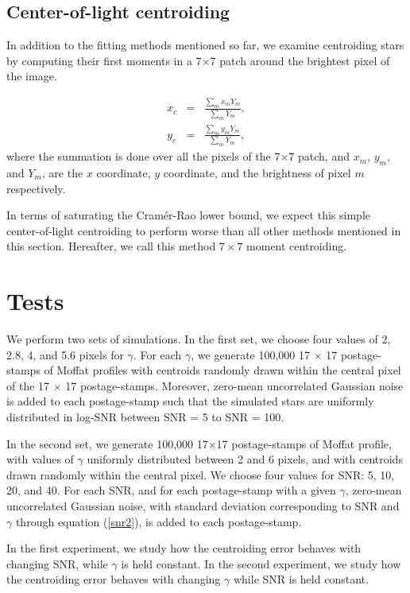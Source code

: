 \documentclass[onecolumn]{aastex61}
\newcommand{\todo}[1]{{\textcolor{dred}{ #1}}}
\begin{document}
\todo{\subsection{Center-of-light centroiding}}
In addition to the fitting methods 
mentioned so far, we examine centroiding 
stars by computing their first moments
in a 7$\times$7 patch around the brightest pixel of the image.

\begin{eqnarray}
x_{c} &=& \frac{\sum_{m}x_{m}Y_{m}}{\sum_{m}Y_{m}}, \\
y_{c} &=& \frac{\sum_{m}y_{m}Y_{m}}{\sum_{m}Y_{m}},
\end{eqnarray}
where the summation is done over all the pixels of the 7$\times$7 patch, and $x_{m}$, 
$y_{m}$, and $Y_{m}$, are the $x$ coordinate, $y$ coordinate, and the brightness
of pixel $m$ respectively.

In terms of saturating the Cram\'{e}r-Rao lower bound, we expect this simple 
center-of-light centroiding to perform worse than all other methods mentioned in 
this section. Hereafter, we call this method $7\times7$ moment centroiding.

\section{Tests}\label{sec:data}

We perform two sets of simulations. In the first set, we choose four values of
2, 2.8, 4, and 5.6 pixels for $\gamma$. For each $\gamma$, we generate 100,000 
17 $\times$ 17 postage-stamps of Moffat profiles with centroids randomly drawn
within the central pixel of the 17 $\times$ 17 postage-stamps. Moreover, zero-mean 
uncorrelated Gaussian noise is added to each postage-stamp such that the simulated 
stars are uniformly distributed in log-SNR between SNR = 5 to SNR = 100.

In the second set, we generate 100,000 17$\times$17 postage-stamps
of Moffat profile, with values of $\gamma$ uniformly distributed 
between 2 and 6 pixels, and with centroids drawn randomly within 
the central pixel. We choose four values for SNR: 5, 10, 20, and 40. 
For each SNR, and for each postage-stamp with a given $\gamma$, 
zero-mean uncorrelated Gaussian noise, with standard deviation corresponding 
to SNR and $\gamma$ through equation (\ref{snr2}), is added to each postage-stamp.

In the first experiment, we study how the centroiding error behaves with changing
SNR, while $\gamma$ is held constant. In the second experiment, we study 
how the centroiding error behaves with changing $\gamma$ while SNR is held constant.
\end{document}
